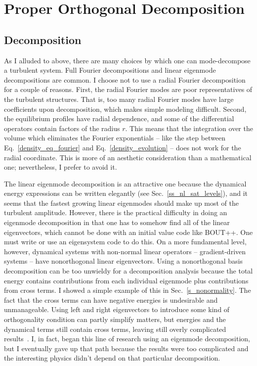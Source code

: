 \section{Proper Orthogonal Decomposition}
\label{s_pod}

\subsection{Decomposition}
\label{ss_pod_decomp}

As I alluded to above, there are many choices by which one can mode-decompose a turbulent system. Full Fourier decompositions and linear eigenmode decompositions are common. I choose
not to use a radial Fourier decomposition for a couple of reasons. First, the radial Fourier modes are poor representatives of the turbulent structures. 
That is, too many radial Fourier modes have large coefficients upon decomposition, which makes simple modeling difficult. Second, the equilibrium profiles have radial dependence,
and some of the differential operators contain factors of the radius $r$. This means that the integration over the volume which eliminates the Fourier exponentials 
-- like the step between Eq.~\ref{density_eq_fourier} and Eq.~\ref{density_evolution} -- does not work for the radial coordinate. This is more of an aesthetic consideration than a mathematical one;
nevertheless, I prefer to avoid it.

The linear eigenmode decomposition is an attractive one because the dynamical energy expressions can be written elegantly (see Sec.~\ref{ss_nl_sat_levels}), and it seems that the fastest growing
linear eigenmodes should make up most of the turbulent amplitude. 
However, there is the practical difficulty in doing an eigenmode decomposition in that one has to somehow find all of the linear eigenvectors, 
which cannot be done with an initial value code like BOUT++. One must write or use an eigensystem code to do this. 
On a more fundamental level, however, dynamical systems with non-normal linear operators -- gradient-driven systems --
have nonorthogonal linear eigenvectors. Using a nonorthogonal basis decomposition can be too unwieldy for a decomposition analysis because the total energy 
contains contributions from each individual eigenmode plus contributions from cross terms. I showed a simple example of this in Sec.~\ref{s_nonormality}. 
The fact that the cross terms can have negative energies is undesirable and unmanageable. Using left and right eigenvectors to introduce some kind of orthogonality condition can
partly simplify matters, but energies and the dynamical terms still contain cross terms, leaving still overly complicated results~\cite{kim2010}.
I, in fact, began this line of research using an eigenmode decomposition, but I eventually
gave up that path because the results were too complicated and the interesting physics didn't depend on that particular decomposition.

